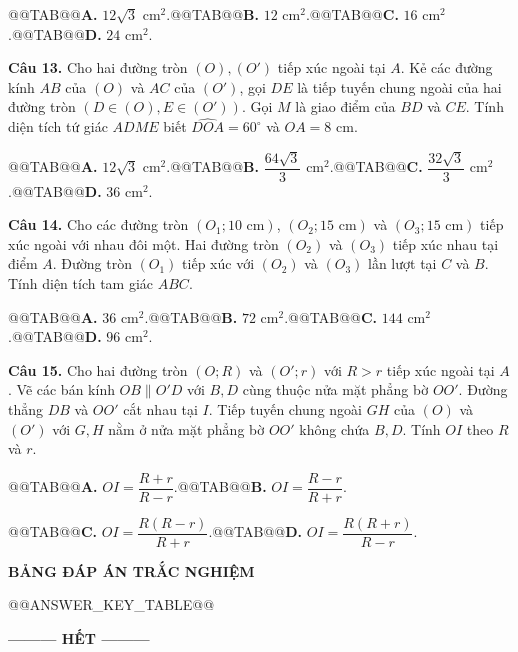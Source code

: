 \documentclass[11pt,a4paper]{article}
\begin{document}
@@TAB@@\textbf{A.} $12\sqrt{3}\text{ cm}^2$.@@TAB@@\textbf{B.} $12\text{ cm}^2$.@@TAB@@\textbf{C.} $16\text{ cm}^2$.@@TAB@@\textbf{D.} $24\text{ cm}^2$.

\textbf{Câu 13.} Cho hai đường tròn $(O), (O')$ tiếp xúc ngoài tại $A$. Kẻ các đường kính $AB$ của $(O)$ và $AC$ của $(O')$, gọi $DE$ là tiếp tuyến chung ngoài của hai đường tròn $(D \in (O), E \in (O'))$. Gọi $M$ là giao điểm của $BD$ và $CE$. Tính diện tích tứ giác $ADME$ biết $\widehat{DOA} = 60^\circ$ và $OA = 8\text{ cm}$.

@@TAB@@\textbf{A.} $12\sqrt{3}\text{ cm}^2$.@@TAB@@\textbf{B.} $\dfrac{64\sqrt{3}}{3}\text{ cm}^2$.@@TAB@@\textbf{C.} $\dfrac{32\sqrt{3}}{3}\text{ cm}^2$.@@TAB@@\textbf{D.} $36\text{ cm}^2$.

\textbf{Câu 14.} Cho các đường tròn $(O_1; 10\text{ cm})$, $(O_2; 15\text{ cm})$ và $(O_3; 15\text{ cm})$ tiếp xúc ngoài với nhau đôi một. Hai đường tròn $(O_2)$ và $(O_3)$ tiếp xúc nhau tại điểm $A$. Đường tròn $(O_1)$ tiếp xúc với $(O_2)$ và $(O_3)$ lần lượt tại $C$ và $B$. Tính diện tích tam giác $ABC$.

@@TAB@@\textbf{A.} $36\text{ cm}^2$.@@TAB@@\textbf{B.} $72\text{ cm}^2$.@@TAB@@\textbf{C.} $144\text{ cm}^2$.@@TAB@@\textbf{D.} $96\text{ cm}^2$.

\textbf{Câu 15.} Cho hai đường tròn $(O; R)$ và $(O'; r)$ với $R > r$ tiếp xúc ngoài tại $A$. Vẽ các bán kính $OB \parallel O'D$ với $B, D$ cùng thuộc nửa mặt phẳng bờ $OO'$. Đường thẳng $DB$ và $OO'$ cắt nhau tại $I$. Tiếp tuyến chung ngoài $GH$ của $(O)$ và $(O')$ với $G, H$ nằm ở nửa mặt phẳng bờ $OO'$ không chứa $B, D$. Tính $OI$ theo $R$ và $r$.

@@TAB@@\textbf{A.} $OI = \dfrac{R+r}{R-r}$.@@TAB@@\textbf{B.} $OI = \dfrac{R-r}{R+r}$.

@@TAB@@\textbf{C.} $OI = \dfrac{R(R-r)}{R+r}$.@@TAB@@\textbf{D.} $OI = \dfrac{R(R+r)}{R-r}$.

\vspace{0.4cm}
\begin{center}
\textbf{BẢNG ĐÁP ÁN TRẮC NGHIỆM}
\end{center}

@@ANSWER_KEY_TABLE@@

\vspace{0.4cm}
\begin{center}
\textbf{--------- HẾT ---------}
\end{center}
\end{document}
